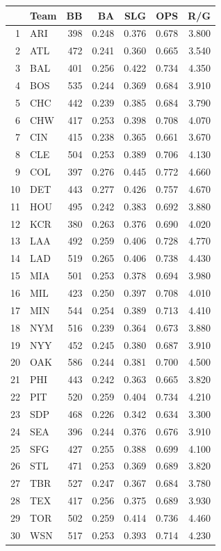 \documentclass[landscape]{article}
\begin{document}
  \begin{table}[H]
    \centering
    \begin{tabular}{rlrrrrr}
      \toprule
         & Team  & BB  & BA    & SLG   & OPS   & R/G \\
      \midrule
      1  & ARI   & 398 & 0.248 & 0.376 & 0.678 & 3.800 \\
      2  & ATL   & 472 & 0.241 & 0.360 & 0.665 & 3.540 \\
      3  & BAL   & 401 & 0.256 & 0.422 & 0.734 & 4.350 \\
      4  & BOS   & 535 & 0.244 & 0.369 & 0.684 & 3.910 \\
      5  & CHC   & 442 & 0.239 & 0.385 & 0.684 & 3.790 \\
      6  & CHW   & 417 & 0.253 & 0.398 & 0.708 & 4.070 \\
      7  & CIN   & 415 & 0.238 & 0.365 & 0.661 & 3.670 \\
      8  & CLE   & 504 & 0.253 & 0.389 & 0.706 & 4.130 \\
      9  & COL   & 397 & 0.276 & 0.445 & 0.772 & 4.660 \\
      10 & DET   & 443 & 0.277 & 0.426 & 0.757 & 4.670 \\
      11 & HOU   & 495 & 0.242 & 0.383 & 0.692 & 3.880 \\
      12 & KCR   & 380 & 0.263 & 0.376 & 0.690 & 4.020 \\
      13 & LAA   & 492 & 0.259 & 0.406 & 0.728 & 4.770 \\
      14 & LAD   & 519 & 0.265 & 0.406 & 0.738 & 4.430 \\
      15 & MIA   & 501 & 0.253 & 0.378 & 0.694 & 3.980 \\
      16 & MIL   & 423 & 0.250 & 0.397 & 0.708 & 4.010 \\
      17 & MIN   & 544 & 0.254 & 0.389 & 0.713 & 4.410 \\
      18 & NYM   & 516 & 0.239 & 0.364 & 0.673 & 3.880 \\
      19 & NYY   & 452 & 0.245 & 0.380 & 0.687 & 3.910 \\
      20 & OAK   & 586 & 0.244 & 0.381 & 0.700 & 4.500 \\
      21 & PHI   & 443 & 0.242 & 0.363 & 0.665 & 3.820 \\
      22 & PIT   & 520 & 0.259 & 0.404 & 0.734 & 4.210 \\
      23 & SDP   & 468 & 0.226 & 0.342 & 0.634 & 3.300 \\
      24 & SEA   & 396 & 0.244 & 0.376 & 0.676 & 3.910 \\
      25 & SFG   & 427 & 0.255 & 0.388 & 0.699 & 4.100 \\
      26 & STL   & 471 & 0.253 & 0.369 & 0.689 & 3.820 \\
      27 & TBR   & 527 & 0.247 & 0.367 & 0.684 & 3.780 \\
      28 & TEX   & 417 & 0.256 & 0.375 & 0.689 & 3.930 \\
      29 & TOR   & 502 & 0.259 & 0.414 & 0.736 & 4.460 \\
      30 & WSN   & 517 & 0.253 & 0.393 & 0.714 & 4.230 \\
      \bottomrule
    \end{tabular}
  \end{table}
\end{document}
